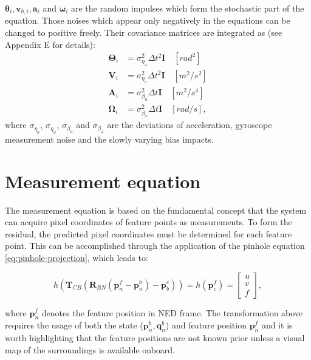 $\boldsymbol{\theta}_i,\mathbf{v}_{b,i},\mathbf{a}_i$ and $\boldsymbol{\omega}_i$ are the random impulses which form the stochastic part of the equation. Those noises which appear only negatively in the equations can be changed to positive freely. Their covariance matrices are integrated as (see \cite{quaternion-eskf} Appendix E for details):
\begin{equation}
\begin{aligned}
    \boldsymbol{\Theta}_i&=\sigma_{\eta_\omega}^2\Delta t^2\mathbf{I} \quad [rad^2] \\
    \mathbf{V}_i&=\sigma_{\eta_a}^2\Delta t^2\mathbf{I} \quad [m^2/s^2]\\
    \mathbf{A}_i&=\sigma_{\beta_a}^2\Delta t\mathbf{I} \quad [m^2/s^4]\\
    \boldsymbol{\Omega}_i&=\sigma_{\beta_\omega}^2\Delta t\mathbf{I} \quad [rad/s],
\end{aligned}
\label{eq:noises}
\end{equation}
where $\sigma_{\eta_a}$, $\sigma_{\eta_\omega}$, $\sigma_{\beta_a}$ and $\sigma_{\beta_\omega}$ are the deviations of acceleration, gyroscope measurement noise and the slowly varying bias impacts.

\section{Measurement equation}

The measurement equation is based on the fundamental concept that the system can acquire pixel coordinates of feature points as measurements. To form the residual, the predicted pixel coordinates must be determined for each feature point. This can be accomplished through the application of the pinhole equation \eqref{eq:pinhole-projection}, which leads to:

\begin{equation}
    h(\mathbf{T}_{CB}(\mathbf{R}_{BN}(\mathbf{p}_n^f-\mathbf{p}_n^b)-\mathbf{p}_b^c))=
    h(\mathbf{p}_c^f)=
    \begin{bmatrix}
        u \\ v \\ f
    \end{bmatrix}, 
\end{equation}

where $\mathbf{p}_n^f$ denotes the feature position in NED frame. The transformation above requires the usage of both the state ($\mathbf{p}_n^b, \mathbf{q}_n^b$) and feature position $\mathbf{p}_n^f$ and it is worth highlighting that the feature positions are not known prior unless a visual map of the surroundings is available onboard.

